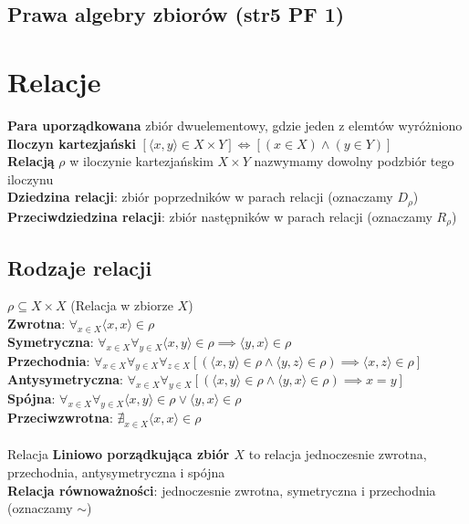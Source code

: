\documentclass[a4paper,12pt]{article}
\begin{document}
\subsection{Prawa algebry zbiorów (str5 PF 1)}

\section{Relacje}
\textbf{Para uporządkowana} zbiór  dwuelementowy, gdzie jeden z elemtów wyróżniono \\
\textbf{Iloczyn kartezjański} $[\langle x,y \rangle \in X \times Y] \iff [(x\in X)\wedge (y\in Y)]$ \\
\textbf{Relacją} $\rho$ w iloczynie kartezjańskim $X \times Y$ nazwymamy dowolny podzbiór tego iloczynu \\
\textbf{Dziedzina relacji}: zbiór poprzedników w parach relacji (oznaczamy $D_\rho$) \\
\textbf{Przeciwdziedzina relacji}: zbiór następników w parach relacji (oznaczamy $R_\rho$)
\subsection{Rodzaje relacji}
$\rho \subseteq X \times X$ (Relacja w zbiorze $X$)\\
\textbf{Zwrotna}: $\forall_{x \in X} \langle x, x \rangle \in \rho $ \\
\textbf{Symetryczna}: $\forall_{x \in X} \forall_{y\in X}\langle x,y \rangle \in \rho \implies \langle y, x \rangle \in \rho $ \\
\textbf{Przechodnia}: $\forall_{x \in X} \forall_{y\in X} \forall_{z\in X} [(\langle x, y \rangle \in \rho \wedge \langle y, z \rangle \in \rho ) \implies \langle x, z \rangle \in \rho ]$ \\
\textbf{Antysymetryczna}: $\forall_{x \in X} \forall_{y\in X} [(\langle x, y \rangle \in \rho \wedge \langle y, x \rangle \in \rho ) \implies x=y]$ \\
\textbf{Spójna}: $\forall_{x \in X}\forall_{y\in X} \langle x,y \rangle\in\rho \vee \langle y,x\rangle\in\rho$\\
\textbf{Przeciwzwrotna}: $\nexists_{x\in X} \langle x,x\rangle \in \rho$\\
\\
Relacja \textbf{Liniowo porządkująca zbiór $X$} to relacja jednoczesnie zwrotna, przechodnia, antysymetryczna i spójna \\
\textbf{Relacja równoważności}: jednoczesnie zwrotna, symetryczna i przechodnia (oznaczamy $ \sim $)
\end{document}
